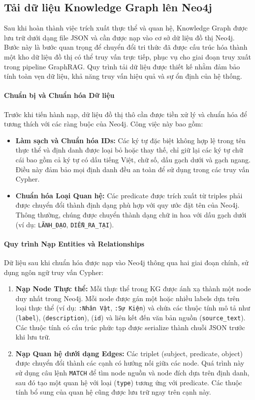 \subsection{Tải dữ liệu Knowledge Graph lên Neo4j}

Sau khi hoàn thành việc trích xuất thực thể và quan hệ, Knowledge Graph được lưu trữ dưới dạng file JSON và cần được nạp vào cơ sở dữ liệu đồ thị Neo4j. Bước này là bước quan trọng để chuyển đổi tri thức đã được cấu trúc hóa thành một kho dữ liệu đồ thị có thể truy vấn trực tiếp, phục vụ cho giai đoạn truy xuất trong pipeline GraphRAG. Quy trình tải dữ liệu được thiết kế nhằm đảm bảo tính toàn vẹn dữ liệu, khả năng truy vấn hiệu quả và sự ổn định của hệ thống.

\paragraph{Chuẩn bị và Chuẩn hóa Dữ liệu}
Trước khi tiến hành nạp, dữ liệu đồ thị thô cần được tiền xử lý và chuẩn hóa để tương thích với các ràng buộc của Neo4j. Công việc này bao gồm:
\begin{itemize}
    \item \textbf{Làm sạch và Chuẩn hóa IDs:} Các ký tự đặc biệt không hợp lệ trong tên thực thể và định danh được loại bỏ hoặc thay thế, chỉ giữ lại các ký tự chữ cái bao gồm cả ký tự có dấu tiếng Việt, chữ số, dấu gạch dưới và gạch ngang. Điều này đảm bảo mọi định danh đều an toàn để sử dụng trong các truy vấn Cypher.
    \item \textbf{Chuẩn hóa Loại Quan hệ:} Các predicate được trích xuất từ triples phải được chuyển đổi thành định dạng phù hợp với quy ước đặt tên của Neo4j. Thông thường, chúng được chuyển thành dạng chữ in hoa với dấu gạch dưới (ví dụ: \texttt{LÃNH\_ĐẠO}, \texttt{DIỄN\_RA\_TẠI}).
\end{itemize}

\paragraph{Quy trình Nạp Entities và Relationships}
Dữ liệu sau khi chuẩn hóa được nạp vào Neo4j thông qua hai giai đoạn chính, sử dụng ngôn ngữ truy vấn Cypher:
\begin{enumerate}
    \item \textbf{Nạp Node Thực thể:} Mỗi thực thể trong KG được ánh xạ thành một node duy nhất trong Neo4j. Mỗi node được gán một hoặc nhiều labels dựa trên loại thực thể (ví dụ: \texttt{:Nhân Vật}, \texttt{:Sự Kiện}) và chứa các thuộc tính mô tả như (\texttt{label}), (\texttt{description}), (\texttt{id}) và liên kết đến văn bản nguồn (\texttt{source\_text}). Các thuộc tính có cấu trúc phức tạp được serialize thành chuỗi JSON trước khi lưu trữ.
    \item \textbf{Nạp Quan hệ dưới dạng Edges:} Các triplet (subject, predicate, object) được chuyển đổi thành các cạnh có hướng nối giữa các node. Quá trình này sử dụng câu lệnh \texttt{MATCH} để tìm node nguồn và node đích dựa trên định danh, sau đó tạo một quan hệ với loại (\texttt{type}) tương ứng với predicate. Các thuộc tính bổ sung của quan hệ cũng được lưu trữ ngay trên cạnh này.
\end{enumerate}

